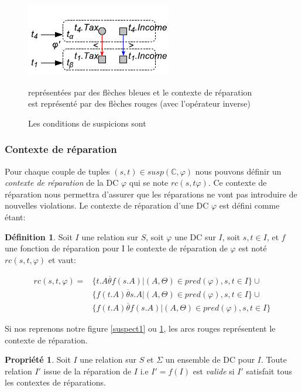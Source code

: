 \documentclass[letterpaper, 12pt]{report}
\theoremstyle{definition}
\newtheorem{mydef}{Définition}
\newtheorem{myprop}{Propriété}
\begin{document}
\begin{figure}
	\centering
	\includegraphics[scale=1]{img/fig3}
	\caption{\label{fig3}Les conditions de suspicions sont} représentées par des flèches bleues et le contexte de réparation \\
	est représenté par des flèches rouges (avec l'opérateur inverse) \\
\end{figure}

\subsubsection{Contexte de réparation}

Pour chaque couple de tuples $(s,t)\in susp(\mathbb{C},\varphi)$ nous pouvons définir un \emph{contexte de réparation} de la DC $\varphi$ qui se note $rc(s,t\varphi)$. Ce contexte de réparation nous permettra d'assurer que les réparations ne vont pas introduire de nouvelles violations. Le contexte de réparation d'une DC $\varphi$ est défini comme étant:

\begin{mydef}
Soit $I$ une relation sur $S$, soit $\varphi$ une DC sur $I$, soit $s,t \in I$, et $f$ une fonction de réparation pour I le contexte de réparation de $\varphi$ est noté $rc(s,t,\varphi)$ et vaut:

\begin{displaymath}
	\begin{split}
		rc(s,t,\varphi) = 
		&\{ t.A \overline{\theta} f(s.A) | (A,\Theta) \in pred(\varphi) , s,t \in I \}\cup\\
		&\{ f(t.A) \overline{\theta} s.A | (A,\Theta) \in pred(\varphi) , s,t \in I  \}\cup\\
		&\{ f(t.A) \overline{\theta} f(s.A) | (A,\Theta) \in pred(\varphi) , s,t \in I  \}
	\end{split}
\end{displaymath}

\end{mydef}
Si nos reprenons notre figure \ref{suspect1}  ou \ref{fig3}, les arcs rouges représentent le contexte de réparation.
 
\begin{myprop}
 Soit $I$ une relation sur $S$ et $\Sigma$ un ensemble de DC pour $I$. Toute relation $I'$ issue de la réparation de $I$ i.e $I' = f(I)$ est \emph{valide} si $I'$ satisfait tous les contextes de réparations.
\end{myprop}
\end{document}
